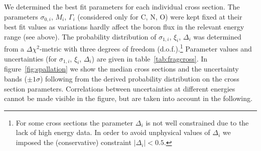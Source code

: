 \documentclass[a4paper,11pt]{article}
\begin{document}
We determined the best fit parameters for each individual cross section. The parameters $\sigma_{0,i}$, $M_i$, $\Gamma_i$ (considered only for C, N, O) were kept fixed at their best fit values as variations hardly affect the boron flux in the relevant energy range (see above). The probability distribution of $\sigma_{1,i}$, $\xi_i$, $\Delta_i$  was determined from a $\Delta\chi^2$-metric with three degrees of freedom (d.o.f.).\footnote{For some cross sections the parameter $\Delta_i$ is not well constrained due to the lack of high energy data. In order to avoid unphysical values of $\Delta_i$ we imposed the (conservative) constraint $|\Delta_i|<0.5$.} Parameter values and uncertainties (for $\sigma_{1,i}$, $\xi_i$, $\Delta_i$) are given in table~\ref{tab:fragcross}. In figure~\ref{fig:spallation} we show the median cross sections and the uncertainty bands ($\pm 1\sigma$) following from the derived probability distribution on the cross section parameters. Correlations between uncertainties at different energies cannot be made visible in the figure, but are taken into account in the following.
\end{document}
